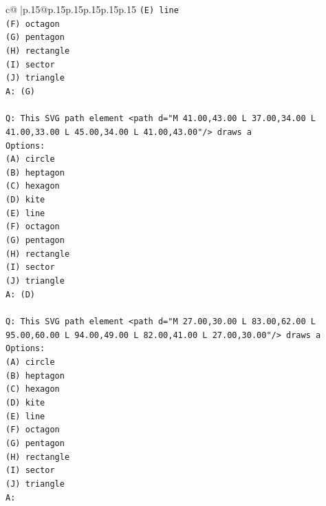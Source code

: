 \documentclass{article}
\begin{document}
{\begin{supertabular}{c@{$\;$}|p{.15\linewidth}@{}p{.15\linewidth}p{.15\linewidth}p{.15\linewidth}p{.15\linewidth}p{.15\linewidth}}
{{{\texttt{(E) line} \\
\texttt{(F) octagon} \\
\texttt{(G) pentagon} \\
\texttt{(H) rectangle} \\
\texttt{(I) sector} \\
\texttt{(J) triangle} \\
\texttt{A: (G)} \\
\\ 
\texttt{Q: This SVG path element <path d="M 41.00,43.00 L 37.00,34.00 L 41.00,33.00 L 45.00,34.00 L 41.00,43.00"/> draws a} \\
\texttt{Options:} \\
\texttt{(A) circle} \\
\texttt{(B) heptagon} \\
\texttt{(C) hexagon} \\
\texttt{(D) kite} \\
\texttt{(E) line} \\
\texttt{(F) octagon} \\
\texttt{(G) pentagon} \\
\texttt{(H) rectangle} \\
\texttt{(I) sector} \\
\texttt{(J) triangle} \\
\texttt{A: (D)} \\
\\ 
\texttt{Q: This SVG path element <path d="M 27.00,30.00 L 83.00,62.00 L 95.00,60.00 L 94.00,49.00 L 82.00,41.00 L 27.00,30.00"/> draws a} \\
\texttt{Options:} \\
\texttt{(A) circle} \\
\texttt{(B) heptagon} \\
\texttt{(C) hexagon} \\
\texttt{(D) kite} \\
\texttt{(E) line} \\
\texttt{(F) octagon} \\
\texttt{(G) pentagon} \\
\texttt{(H) rectangle} \\
\texttt{(I) sector} \\
\texttt{(J) triangle} \\
\texttt{A:} \\
            }
        }
    }
     \\ \\


\end{supertabular}}
\end{document}
